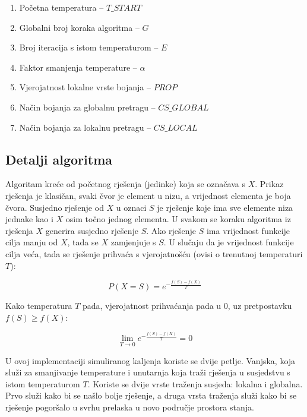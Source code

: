 \documentclass[times, utf8, diplomski, numeric]{fer}
\begin{document}
\begin{enumerate}
	\item Početna temperatura -- $T\_START$
	\item Globalni broj koraka algoritma -- $G$
	\item Broj iteracija s istom temperaturom -- $E$
	\item Faktor smanjenja temperature -- $\alpha$
	\item Vjerojatnost lokalne vrste bojanja -- $PROP$
	\item Način bojanja za globalnu pretragu -- $CS\_GLOBAL$
	\item Način bojanja za lokalnu pretragu -- $CS\_LOCAL$
\end{enumerate}

\subsection{Detalji algoritma}

Algoritam kreće od početnog rješenja (jedinke) koja se označava s $X$. Prikaz rješenja je klasičan, svaki čvor je element u nizu, a vrijednost  elementa je boja čvora. Susjedno rješenje od $X$ u oznaci $S$ je rješenje koje ima sve elemente niza jednake kao i $X$ osim točno jednog elementa. U svakom se koraku algoritma iz rješenja $X$ generira susjedno rješenje $S$. Ako rješenje $S$ ima vrijednost funkcije cilja manju od $X$, tada se $X$ zamjenjuje s $S$. U slučaju da je vrijednost funkcije cilja veća, tada se rješenje prihvaća s vjerojatnošću (ovisi o trenutnoj temperaturi $T$):
 
\begin{equation}
	P(X=S) = e^{-\frac{f(S)-f(X)}{T}}
\end{equation}

Kako temperatura $T$ pada, vjerojatnost prihvaćanja pada u $0$, uz pretpostavku $f(S)\ge f(X)$:

\begin{equation}
	\lim_{T\rightarrow 0 } e^{-\frac{f(S)-f(X)}{T}} = 0	
\end{equation}

U ovoj implementaciji simuliranog kaljenja koriste se dvije petlje. Vanjska, koja služi za smanjivanje temperature i unutarnja koja traži rješenja u susjedstvu s istom temperaturom $T$. Koriste se dvije vrste traženja susjeda: lokalna i globalna. Prvo služi kako bi se našlo bolje rješenje, a druga vrsta traženja služi kako bi se rješenje pogoršalo u svrhu prelaska u novo područje prostora stanja. 
\end{document}
